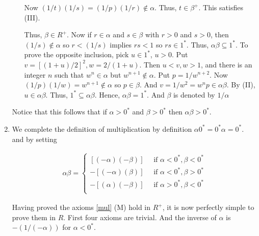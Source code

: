 \begin{enumerate}[{\bf Step 1.}]
\begin{enumerate}[(M1)]
    Now $(1/t)(1/s) = (1/p)(1/r) \notin \alpha$. Thus, $t \in \beta^+$.
    This satisfies (III).

    Thus, $\beta \in R^+$.
    \bigbreak \quad
    Now if $r \in \alpha$ and $s \in \beta$ with $r > 0$ and $s > 0$, 
    then $(1/s) \notin \alpha$ so $r < (1/s)$ implies $rs < 1$ so $rs \in 1^*$.
    Thus, $\alpha \beta \subseteq 1^*$.
    \bigbreak \quad
    To prove the opposite inclusion, pick $u \in 1^*$, $u > 0$.
    Put $v=[(1+u)/2]^2, w=2/(1+u)$. Then $u < v, w > 1$, and there is an integer $n$ 
    such that $w^n \in \alpha$ but $w^{n+1} \notin \alpha$.
    \bigbreak \quad
    Put $p = 1 / w^{n+2}$. Now $(1/p)(1/w) = w^{n+1} \notin \alpha$ so $p \in \beta$.
    And $v = 1/w^2 = w^n p \in \alpha \beta$. By (II), $u \in \alpha \beta$. Thus, $1^* \subseteq \alpha \beta$.
    \bigbreak
    Hence, $\alpha \beta = 1^*$. And $\beta$ is denoted by $1 / \alpha$

\end{enumerate}

Notice that this follows that if $\alpha > 0^*$ and $\beta > 0^*$ then $\alpha \beta > 0^*$.

\item We complete the definition of multiplication by definition $\alpha 0^* = 0^* \alpha = 0^*$.
and by setting 

\begin{gather*}
    \alpha \beta = 
    \begin{cases}
      [(-\alpha)(-\beta)] \quad \text{ if } \alpha < 0^*, \beta < 0^* \\
      -[(-\alpha)(\beta)] \quad \text{ if } \alpha < 0^*, \beta > 0^* \\
      -[(\alpha)(-\beta)] \quad \text{ if } \alpha > 0^*, \beta < 0^* \\
    \end{cases}
\end{gather*}

Having proved the axioms \ref{mul} (M) hold in $R^+$, it is now perfectly simple to prove them in $R$.
First four axioms are trivial. And the inverse of $\alpha$ is $-(1/(-\alpha))$ for $\alpha < 0^*$.

\end{enumerate}